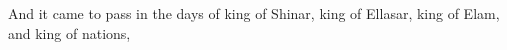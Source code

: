
\bverse And it came to pass in the days of  king of Shinar,  king of Ellasar,  king of Elam, and  king of nations,
\bverse 
\bverse 
\bverse 
\bverse 
\bverse 
\bverse 
\bverse 
\bverse 
\bverse 
\bverse 
\bverse 
\bverse 
\bverse 
\bverse 
\bverse 
\bverse 
\bverse 
\bverse 
\bverse 
\bverse 
\bverse 
\bverse 
\bverse 
